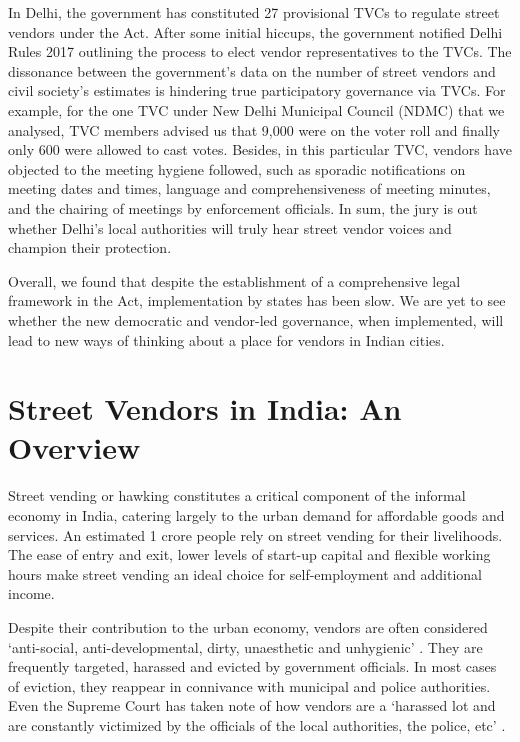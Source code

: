 \documentclass[a4paper, 12pt, twoside, table]{article}
\begin{document}
{In Delhi, the government has constituted 27 provisional TVCs to regulate street vendors under the Act. After some initial hiccups, the government notified Delhi Rules 2017 outlining the process to elect vendor representatives to the TVCs. The dissonance between the government’s data on the number of street vendors and civil society’s estimates is hindering true participatory governance via TVCs. For example, for the one TVC under New Delhi Municipal Council (NDMC) that we analysed, TVC members advised us that 9,000 were on the voter roll and finally only 600 were allowed to cast votes. Besides, in this particular TVC, vendors have objected to the meeting hygiene followed, such as sporadic notifications on meeting dates and times, language and comprehensiveness of meeting minutes, and the chairing of meetings by enforcement officials. In sum, the jury is out whether Delhi’s local authorities will truly hear street vendor voices and champion their protection. 

Overall, we found that despite the establishment of a comprehensive legal framework in the Act, implementation by states has been slow. We are yet to see whether the new democratic and vendor-led governance, when implemented, will lead to new ways of thinking about a place for vendors in Indian cities.

\newpage
\section*{Street Vendors in India: An Overview}
Street vending or hawking constitutes a critical component of the informal economy in India, catering largely to the urban demand for affordable goods and services. An estimated 1 crore people \parencite{jhapaper} rely on street vending for their livelihoods. The ease of entry and exit, lower levels of start-up capital and flexible working hours make street vending an ideal choice for self-employment and additional income. 

Despite their contribution to the urban economy, vendors are often considered `anti-social, anti-developmental, dirty, unaesthetic and unhygienic' \parencite{wiego}. They are frequently targeted, harassed and evicted by government officials. In most cases of eviction, they reappear in connivance with municipal and police authorities. Even the Supreme Court has taken note of how vendors are a `harassed lot and are constantly victimized by the officials of the local authorities, the police, etc' \parencite{MEHU}.

}
\end{document}
